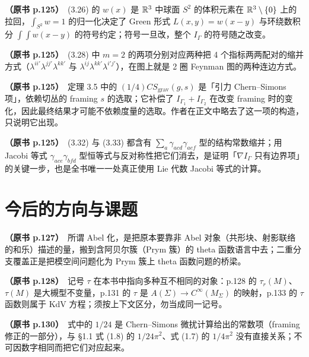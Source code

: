 \noindent \textbf{（原书 p.125）}\ (3.26) 的 $w(x)$ 是 $\mathbb{R}^{3}$ 中球面 $S^{2}$ 的体积元素在 $\mathbb{R}^{3}\setminus\{0\}$ 上的拉回，$\int_{S^{2}}w=1$ 的归一化决定了 Green 形式 $L(x,y)=w(x-y)$ 与环绕数积分 $\int\!\!\int w(x-y)$ 的符号约定；符号一旦改，整个 $I_{\Gamma}$ 的符号随之改变。\par\smallskip

\noindent \textbf{（原书 p.125）}\ (3.28) 中 $m=2$ 的两项分别对应两种把 4 个指标两两配对的缩并方式（$\lambda^{ii'}\lambda^{jj'}\lambda^{kk'}$ 与 $\lambda^{ij}\lambda^{kk'}\lambda^{i'j'}$），在图上就是 2 圈 Feynman 图的两种连边方式。\par\smallskip

\noindent \textbf{（原书 p.125）}\ 定理 3.5 中的 $(1/4)CS_{\mathrm{grav}}(g,s)$ 是「引力 Chern--Simons 项」，依赖切丛的 framing $s$ 的选取；它补偿了 $I_{\Gamma_1}+I_{\Gamma_2}$ 在改变 framing 时的变化，因此最终结果才可能不依赖度量的选取。作者在正文中略去了这一项的构造，只说明它出现。\par\smallskip

\noindent \textbf{（原书 p.125）}\ (3.32) 与 (3.33) 都含有 $\sum_a\gamma_{acd}\gamma_{aef}$ 型的结构常数缩并；用 Jacobi 等式 $\gamma_{ace}\gamma_{bfd}$ 型恒等式与反对称性把它们消去，是证明「$\nabla I_{\Gamma}$ 只有边界项」的关键一步，也是全书唯一一处真正使用 Lie 代数 Jacobi 等式的计算。\par\smallskip

\section*{今后的方向与课题}

\noindent \textbf{（原书 p.127）}\ 所谓 Abel 化，是把原本要靠非 Abel 对象（共形块、射影联络的和乐）描述的量，搬到含阿贝尔簇（Prym 簇）的 theta 函数语言中去；二重分支覆盖正是把模空间问题化为 Prym 簇上 theta 函数问题的桥梁。\par\smallskip

\noindent \textbf{（原书 p.128）}\ 记号 $\tau$ 在本书中指向多种互不相同的对象：p.128 的 $\tau_r(M)$、$\tau(M)$ 是大槻型不变量，p.131 的 $\tau$ 是 $A(\Sigma)\to C^{\infty}(M_{\Sigma})$ 的映射，p.133 的 $\tau$ 函数则属于 KdV 方程；须按上下文区分，勿当成同一记号。\par\smallskip

\noindent \textbf{（原书 p.130）}\ 式中的 $1/24$ 是 Chern--Simons 微扰计算给出的常数项（framing 修正的一部分），与 §1.1 式 (1.8) 的 $1/24\pi^{2}$、式 (1.7) 的 $1/4\pi^{2}$ 没有直接关系；不可因数字相同而把它们对应起来。\par\smallskip

